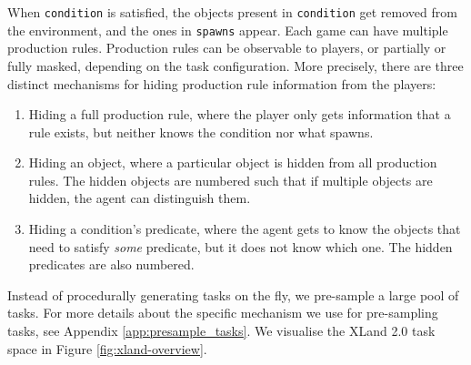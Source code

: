 When \texttt{condition} is satisfied, the objects present in \texttt{condition} get removed from the environment, and the ones in \texttt{spawns} appear.
Each game can have multiple production rules. Production rules can be observable to players, or partially or fully masked, depending on the task configuration. More precisely, there are three distinct mechanisms for hiding production rule information from the players: 

\begin{enumerate}
    \item Hiding a full production rule, where the player only gets information that a rule exists, but neither knows the condition nor what spawns.
    \item Hiding an object, where a particular object is hidden from all production rules. The hidden objects are numbered such that if multiple objects are hidden, the agent can distinguish them.
    \item Hiding a condition's predicate, where the agent gets to know the objects that need to satisfy \textit{some} predicate, but it does not know which one. The hidden predicates are also numbered.
\end{enumerate}

Instead of procedurally generating tasks on the fly, we pre-sample a large pool of tasks. For more details about the specific mechanism we use for pre-sampling tasks, see Appendix \ref{app:presample_tasks}. We visualise the XLand 2.0 task space in Figure \ref{fig:xland-overview}.

